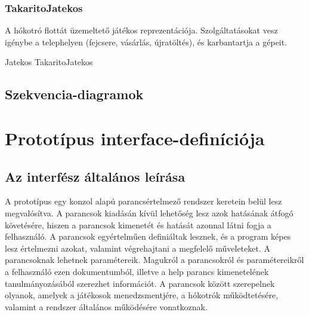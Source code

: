 \subsubsection{TakaritoJatekos}
\begin{class-template-responsibility}
    A hókotró flottát üzemeltető játékos reprezentációja. Szolgáltatásokat vesz igénybe a telephelyen (fejcsere, vásárlás, újratöltés), és karbantartja a gépeit.
\end{class-template-responsibility}
\begin{class-template-baseclass}
    Jatekos \baseclass TakaritoJatekos 
\end{class-template-baseclass}
\begin{class-template-method}
\end{class-template-method}

\subsection{Szekvencia-diagramok}
\comment{\hrule}

\clearpage
\section{Prototípus interface-definíciója}

\subsection{Az interfész általános leírása}
A prototípus egy konzol alapú parancsértelmező rendszer keretein belül lesz megvalósítva. A parancsok kiadásán kívül lehetőség lesz azok hatásának átfogó követésére, hiszen a parancsok kimenetét és hatását azonnal látni fogja a felhasználó. A parancsok egyértelműen definiáltak lesznek, és a program képes lesz értelmezni azokat, valamint végrehajtani a megfelelő műveleteket. A parancsoknak lehetnek paramétereik. Magukról a parancsokról és paramétereikről a felhasználó ezen dokumentumból, illetve a help parancs kimenetelének tanulmányozásából szerezhet információt. A parancsok között szerepelnek olyanok, amelyek a játékosok menedzsmentjére, a hókotrók működtetésére, valamint a rendszer általános működésére vonatkoznak.
